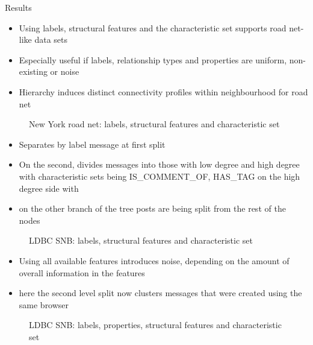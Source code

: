 \documentclass[rgb]{beamer}
\begin{document}
\begin{frame}[allowframebreaks]{Results}
             \begin{itemize}
                 \item Using labels, structural features and the characteristic set supports road net-like data sets
                 \item Especially useful if labels, relationship types and properties are uniform, non-existing or noise
                 \item Hierarchy induces distinct connectivity profiles within neighbourhood for road net
             \end{itemize}
             \begin{figure}[htp]
                \centering
                
                \caption{New York road net: labels, structural features and characteristic set}
            \end{figure}{}
        \framebreak 
        
            \begin{itemize}
                \item Separates by label message at first split
                \item On the second, divides messages into those with low degree and high degree with characteristic sets being IS\_COMMENT\_OF, HAS\_TAG on the high degree side with 
                \item on the other branch of the tree posts are being split from the rest of the nodes
            \end{itemize}
            \begin{figure}[htp]
                \centering
                
                \caption{LDBC SNB: labels, structural features and characteristic set}
            \end{figure}{}
        \framebreak
        
            \begin{itemize}
                \item Using all available features introduces noise, depending on the amount of overall information in the features
                \item here the second level split now clusters messages that were created using the same browser
            \end{itemize}
            \begin{figure}[htp]
                \centering
                
                \caption{LDBC SNB: labels, properties, structural features and characteristic set}
            \end{figure}{}
        \end{frame}
        
\end{document}

